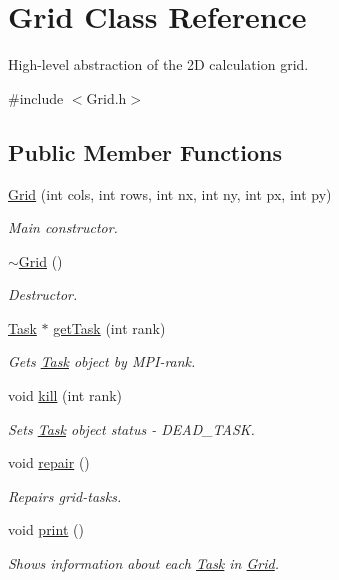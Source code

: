 \hypertarget{classGrid}{}\section{Grid Class Reference}
\label{classGrid}


High-\/level abstraction of the 2D calculation grid.  




{\ttfamily \#include $<$Grid.\+h$>$}

\subsection*{Public Member Functions}
\begin{DoxyCompactItemize}
\item 
\hyperlink{classGrid_a2d5d845fa954d901ecbcd278e7b45aae}{Grid} (int cols, int rows, int nx, int ny, int px, int py)
\begin{DoxyCompactList}\small\item\em Main constructor. \end{DoxyCompactList}\item 
\hyperlink{classGrid_a3661d0a7f998caaaf8627d7a67072116}{$\sim$\+Grid} ()
\begin{DoxyCompactList}\small\item\em Destructor. \end{DoxyCompactList}\item 
\hyperlink{classTask}{Task} $\ast$ \hyperlink{classGrid_a7b02e5a724228ddae4eacc836f6afcba}{get\+Task} (int rank)
\begin{DoxyCompactList}\small\item\em Gets \hyperlink{classTask}{Task} object by M\+P\+I-\/rank. \end{DoxyCompactList}\item 
void \hyperlink{classGrid_af6b2bb427269c20153b51c96571d67a6}{kill} (int rank)
\begin{DoxyCompactList}\small\item\em Sets \hyperlink{classTask}{Task} object status -\/ \textquotesingle{}D\+E\+A\+D\+\_\+\+T\+A\+SK\textquotesingle{}. \end{DoxyCompactList}\item 
void \hyperlink{classGrid_a45bca1a92d2e19536c7d7c23db9fe665}{repair} ()
\begin{DoxyCompactList}\small\item\em Repairs grid-\/tasks. \end{DoxyCompactList}\item 
void \hyperlink{classGrid_a8f86511ed049044225a4116dd1c2a2e2}{print} ()
\begin{DoxyCompactList}\small\item\em Shows information about each \hyperlink{classTask}{Task} in \hyperlink{classGrid}{Grid}. \end{DoxyCompactList}\end{DoxyCompactItemize}
